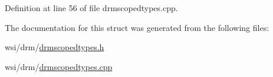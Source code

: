 Definition at line 56 of file drmscopedtypes.\+cpp.


\begin{DoxyCode}{0}
\end{DoxyCode}


The documentation for this struct was generated from the following files\+:\begin{DoxyCompactItemize}
\item 
wsi/drm/\mbox{\hyperlink{drmscopedtypes_8h}{drmscopedtypes.\+h}}\item 
wsi/drm/\mbox{\hyperlink{drmscopedtypes_8cpp}{drmscopedtypes.\+cpp}}\end{DoxyCompactItemize}
